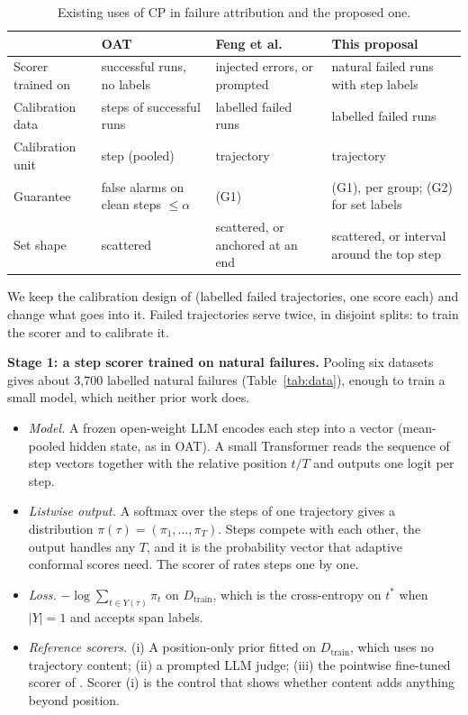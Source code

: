 \documentclass[10pt,a4paper]{article}
\makeatletter
\renewcommand\section{\@startsection{section}{1}{\z@}{6pt plus 2pt minus 1pt}{2pt}{\normalsize\bfseries}}
\newcommand{\traj}{\tau}
\newcommand{\tstar}{t^{*}}
\newcommand{\Dtrain}{D_{\mathrm{train}}}
\makeatother
\begin{document}
\begin{table}[h]
\centering\small
\begin{tabularx}{\linewidth}{@{}l L L L@{}}\toprule
 & OAT \cite{yeh2026oat} & Feng et al.\ \cite{feng2026conformal} & This proposal\\\midrule
Scorer trained on & successful runs, no labels & injected errors, or prompted & natural failed runs with step labels\\
Calibration data & steps of successful runs & labelled failed runs & labelled failed runs\\
Calibration unit & step (pooled) & trajectory & trajectory\\
Guarantee & false alarms on clean steps $\le\alpha$ & (G1) & (G1), per group; (G2) for set labels\\
Set shape & scattered & scattered, or anchored at an end & scattered, or interval around the top step\\\bottomrule
\end{tabularx}
\caption{Existing uses of CP in failure attribution and the proposed one.}\label{tab:compare}
\end{table}

\section{Proposed Approach}

We keep the calibration design of \cite{feng2026conformal} (labelled failed trajectories, one score each) and change what goes into it. Failed trajectories serve twice, in disjoint splits: to train the scorer and to calibrate it.

\textbf{Stage 1: a step scorer trained on natural failures.} Pooling six datasets gives about 3{,}700 labelled natural failures (Table~\ref{tab:data}), enough to train a small model, which neither prior work does.
\begin{itemize}
\item \emph{Model.} A frozen open-weight LLM encodes each step into a vector (mean-pooled hidden state, as in OAT). A small Transformer reads the sequence of step vectors together with the relative position $t/T$ and outputs one logit per step.
\item \emph{Listwise output.} A softmax over the steps of one trajectory gives a distribution $\pi(\traj)=(\pi_1,\dots,\pi_T)$. Steps compete with each other, the output handles any $T$, and it is the probability vector that adaptive conformal scores need. The scorer of \cite{feng2026conformal} rates steps one by one.
\item \emph{Loss.} $-\log\sum_{t\in Y(\traj)}\pi_t$ on $\Dtrain$, which is the cross-entropy on $\tstar$ when $|Y|=1$ and accepts span labels.
\item \emph{Reference scorers.} (i) A position-only prior fitted on $\Dtrain$, which uses no trajectory content; (ii) a prompted LLM judge; (iii) the pointwise fine-tuned scorer of \cite{feng2026conformal}. Scorer (i) is the control that shows whether content adds anything beyond position.
\end{itemize}
\end{document}
